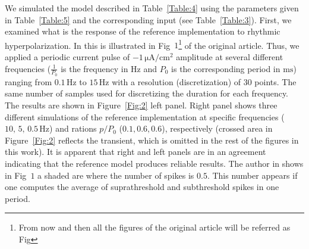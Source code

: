 \documentclass[10pt,a4paper,onecolumn]{article}
\newcommand{\Rm}[1]{\mathrm{#1}}
\begin{document}
We simulated the model described in Table~\ref{Table:4} using the parameters
given in Table~\ref{Table:5} and the corresponding input (see 
Table~\ref{Table:3}). First, we examined what is the response of the reference 
implementation to rhythmic hyperpolarization. In \cite{wang:1994} this is 
illustrated in Fig~$1$\footnote{From now and then all the 
    figures of the original article will be referred as Fig} of the original
article. 
Thus, we applied a periodic current pulse of $-1\,\Rm{\mu A/cm^2}$ amplitude at
several different frequencies ($\frac{1}{P_0}$ is the frequency in $\Rm{Hz}$
and $P_0$ is the corresponding period in $\Rm{ms}$) ranging from 
$0.1\,\Rm{Hz}$ to $15\,\Rm{Hz}$ with a resolution (discretization) of $30$ 
points. The same number of samples used for discretizing the duration for each 
frequency. The results are shown in Figure~\ref{Fig:2} left panel. Right panel
shows three different simulations of the reference implementation at specific
frequencies ($10,\, 5,\, 0.5\, \Rm{Hz}$) and rations $p/P_0$ ($0.1, 0.6, 0.6$),
respectively (crossed area in Figure~\ref{Fig:2} reflects the transient, which 
is omitted in the rest of the figures in this work). It is apparent that right
and left panels are in an agreement indicating that the reference model
produces reliable results. 
The author in \cite{wang:1994} shows in Fig~$1$ a shaded are where the number 
of spikes is $0.5$. This number appears if one computes the average of 
suprathreshold and subthreshold spikes in one period.  
\end{document}
